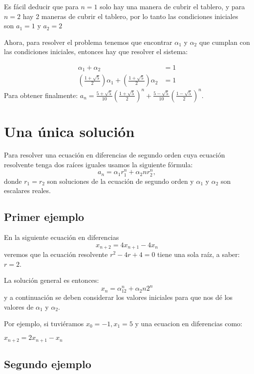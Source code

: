 \documentclass{report}
\begin{document}
Es fácil deducir que para $n=1$ solo hay una manera de cubrir el
tablero, y para $n=2$ hay 2 maneras de cubrir el tablero, por lo tanto
las condiciones iniciales son $a_1=1$ y $a_2=2$

Ahora, para resolver el problema tenemos que encontrar $\alpha_1$ y
$\alpha_2$ que cumplan con las condiciones iniciales, entonces hay que
resolver el sistema:

\begin{align*}
\alpha_{1} + \alpha_{2} &= 1\\
(\frac{1+\sqrt{5}}{2})\alpha_{1} + (\frac{1+\sqrt{5}}{2})\alpha_{2}&=1
\end{align*}
Para obtener finalmente:
$a_{n}= \frac{5+\sqrt{5}}{10}(\frac{1+\sqrt{5}}{2})^n +
\frac{5-\sqrt{5}}{10}(\frac{1-\sqrt{5}}{2})^n$.

\section{Una única solución}
\label{sec:unica}

Para resolver una ecuación en diferencias de segundo orden cuya
ecuación resolvente tenga dos raíces iguales usamos la siguiente fórmula:
\begin{equation}
 \label{raicesiguales}
 a_n=\alpha_1r_1^n +\alpha_2nr_2^n,
\end{equation}
donde $r_1=r_2$ son soluciones de la ecuación de segundo orden y
$\alpha_1$ y $\alpha_2$ son escalares reales.

\subsection{Primer ejemplo}

En la siguiente ecuación en diferencias
\begin{equation}
  \label{eq:1}
  x_{n+2}=4x_{n+1}-4x_{n}
\end{equation}
veremos que la ecuación resolvente $r^2-4r+4=0$ tiene una sola raíz, a
saber: $r=2$.

La solución general es entonces:
$$x_n=\alpha_12^n+\alpha_2n2^n$$
y a continuación se deben considerar los valores iniciales para que
nos dé los valores de $\alpha_1$ y $\alpha_2$.

Por ejemplo, si tuviéramos $x_0=-1,x_1=5$ y una ecuacion en diferencias como:

$x_{n+2}=2x_{n+1}-x_n$

\subsection{Segundo ejemplo}
\end{document}
